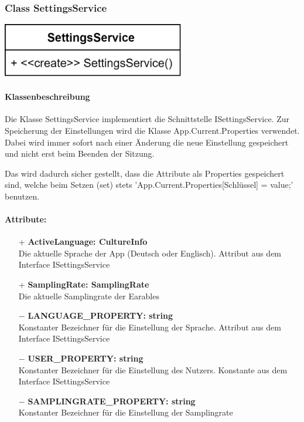 \documentclass[a4paper,12pt]{article}
\begin{document}
\begin{minipage}[b]{0.6\textwidth}
	\subsubsection{Class SettingsService}
\end{minipage}
\begin{minipage}[c]{0.5\textwidth}
	\includegraphics[width=0.6\textwidth]{bilder/EMKlassen/SettingsServiceClass.png}
\end{minipage}
	\paragraph{Klassenbeschreibung}
	Die Klasse SettingsService implementiert die Schnittstelle ISettingsService. Zur Speicherung der Einstellungen wird die Klasse App.Current.Properties verwendet.
	Dabei wird immer sofort nach einer Änderung die neue Einstellung gespeichert und nicht erst beim Beenden der Sitzung.

	Das wird dadurch sicher gestellt, dass die Attribute als Properties gespeichert sind, welche beim Setzen (set) stets 'App.Current.Properties[Schlüssel] = value;' benutzen.
	\paragraph{Attribute:}
	\begin{itemize}
		\item[+] \textbf{ActiveLanguage: CultureInfo}\\Die aktuelle Sprache der App (Deutsch oder Englisch). Attribut aus dem Interface ISettingsService\\
		\item[+] \textbf{SamplingRate: SamplingRate}\\Die aktuelle Samplingrate der \Gls{Earables} \\ 
		\item[$-$] \textbf{LANGUAGE\_PROPERTY: string}\\Konstanter Bezeichner für die Einstellung der Sprache. Attribut aus dem Interface ISettingsService \\
		\item[$-$] \textbf{USER\_PROPERTY: string}\\Konstanter Bezeichner für die Einstellung des Nutzers. Konstante aus dem Interface ISettingsService \\
		\item[$-$] \textbf{SAMPLINGRATE\_PROPERTY: string}\\Konstanter Bezeichner für die Einstellung der Samplingrate \\
	\end{itemize}
\end{document}
